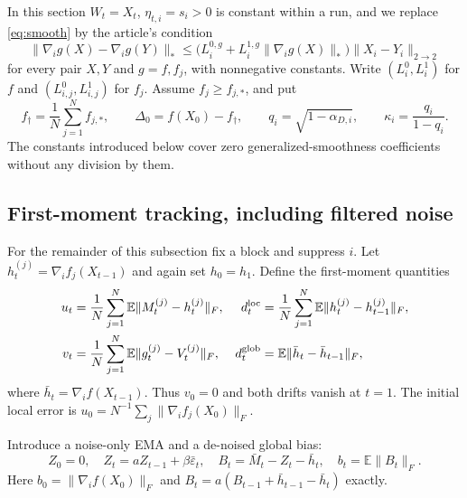 \documentclass[11pt]{article}
\newcommand{\E}{\mathbb E}
\newcommand{\op}[1]{\lVert #1\rVert_{2\to2}}
\newcommand{\nuc}[1]{\lVert #1\rVert_*}
\newcommand{\frob}[1]{\lVert #1\rVert_F}
\newcommand{\avg}{\frac1N\sum_{j=1}^N}
\begin{document}
In this section $W_t=X_t$, $\eta_{t,i}=s_i>0$ is constant within a run,
and we replace \eqref{eq:smooth} by the article's condition
\begin{equation}\label{eq:generalized}
 \nuc{\nabla_i g(X)-\nabla_i g(Y)}
 \le\bigl(L_i^{0,g}+L_i^{1,g}\nuc{\nabla_i g(X)}\bigr)\op{X_i-Y_i}
\end{equation}
for every pair $X,Y$ and $g=f,f_j$, with nonnegative constants.
Write $(L_i^0,L_i^1)$ for $f$ and $(L_{i,j}^0,L_{i,j}^1)$ for $f_j$.
Assume $f_j\ge f_{j,*}$, and put
\[
 f_\dagger=\avg f_{j,*},\qquad
 \Delta_0=f(X_0)-f_\dagger,\qquad
 q_i=\sqrt{1-\alpha_{D,i}},\qquad \kappa_i=\frac{q_i}{1-q_i}.
\]
The constants introduced below cover zero generalized-smoothness
coefficients without any division by them.

\subsection{First-moment tracking, including filtered noise}

For the remainder of this subsection fix a block and suppress $i$.
Let $h_t^{(j)}=\nabla_i f_j(X_{t-1})$ and again set $h_0=h_1$.
Define the first-moment quantities
\begin{align*}
 u_t&=\avg\E\frob{M_t^{(j)}-h_t^{(j)}},
 &d_t^{\rm loc}&=\avg\E\frob{h_t^{(j)}-h_{t-1}^{(j)}},\\
 v_t&=\avg\E\frob{g_t^{(j)}-V_t^{(j)}},
 &d_t^{\rm glob}&=\E\frob{\bar h_t-\bar h_{t-1}},
\end{align*}
where $\bar h_t=\nabla_i f(X_{t-1})$. Thus $v_0=0$ and both
drifts vanish at $t=1$. The initial local error is
$u_0=N^{-1}\sum_j\frob{\nabla_i f_j(X_0)}$.

Introduce a noise-only EMA and a de-noised global bias:
\begin{equation}\label{eq:debias}
 Z_0=0,\quad Z_t=aZ_{t-1}+\beta\bar\varepsilon_t,\quad
 B_t=\bar M_t-Z_t-\bar h_t,\quad b_t=\E\frob{B_t}.
\end{equation}
Here $b_0=\frob{\nabla_i f(X_0)}$ and
$B_t=a(B_{t-1}+\bar h_{t-1}-\bar h_t)$ exactly.
\end{document}
